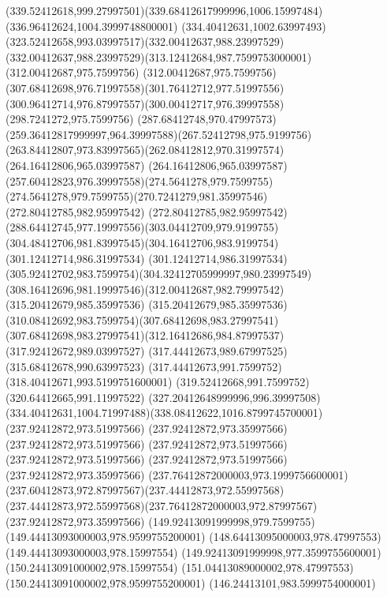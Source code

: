 {{	\curveto(339.52412618,999.27997501)(339.68412617999996,1006.15997484)(336.96412624,1004.3999748800001)
	\curveto(334.40412631,1002.63997493)(323.52412658,993.03997517)(332.00412637,988.23997529)
	\curveto(332.00412637,988.23997529)(313.12412684,987.7599753000001)(312.00412687,975.7599756)
	\curveto(312.00412687,975.7599756)(307.68412698,976.71997558)(301.76412712,977.51997556)
	\curveto(300.96412714,976.87997557)(300.00412717,976.39997558)(298.7241272,975.7599756)
	\curveto(287.68412748,970.47997573)(259.36412817999997,964.39997588)(267.52412798,975.9199756)
	\curveto(263.84412807,973.83997565)(262.08412812,970.31997574)(264.16412806,965.03997587)
	\curveto(264.16412806,965.03997587)(257.60412823,976.39997558)(274.5641278,979.7599755)
	\curveto(274.5641278,979.7599755)(270.7241279,981.35997546)(272.80412785,982.95997542)
	\curveto(272.80412785,982.95997542)(288.64412745,977.19997556)(303.04412709,979.9199755)
	\curveto(304.48412706,981.83997545)(304.16412706,983.9199754)(301.12412714,986.31997534)
	\curveto(301.12412714,986.31997534)(305.92412702,983.7599754)(304.32412705999997,980.23997549)
	\curveto(308.16412696,981.19997546)(312.00412687,982.79997542)(315.20412679,985.35997536)
	\curveto(315.20412679,985.35997536)(310.08412692,983.7599754)(307.68412698,983.27997541)
	\curveto(307.68412698,983.27997541)(312.16412686,984.87997537)(317.92412672,989.03997527)
	\lineto(317.44412673,989.67997525)
	\lineto(315.68412678,990.63997523)
	\lineto(317.44412673,991.7599752)
	\lineto(318.40412671,993.5199751600001)
	\lineto(319.52412668,991.7599752)
	\lineto(320.64412665,991.11997522)
	\curveto(327.20412648999996,996.39997508)(334.40412631,1004.71997488)(338.08412622,1016.8799745700001)
	\closepath
	\moveto(237.92412872,973.51997566)
	\lineto(237.92412872,973.35997566)
	\lineto(237.92412872,973.51997566)
	\closepath
	\moveto(237.92412872,973.51997566)
	\lineto(237.92412872,973.51997566)
	\lineto(237.92412872,973.51997566)
	\closepath
	\moveto(237.92412872,973.35997566)
	\curveto(237.76412872000003,973.1999756600001)(237.60412873,972.87997567)(237.44412873,972.55997568)
	\curveto(237.44412873,972.55997568)(237.76412872000003,972.87997567)(237.92412872,973.35997566)
	\closepath
	\moveto(149.92413091999998,979.7599755)
	\lineto(149.44413093000003,978.9599755200001)
	\lineto(148.64413095000003,978.47997553)
	\lineto(149.44413093000003,978.15997554)
	\lineto(149.92413091999998,977.3599755600001)
	\lineto(150.24413091000002,978.15997554)
	\lineto(151.04413089000002,978.47997553)
	\lineto(150.24413091000002,978.9599755200001)
	\closepath
	\moveto(146.24413101,983.5999754000001)
}}
